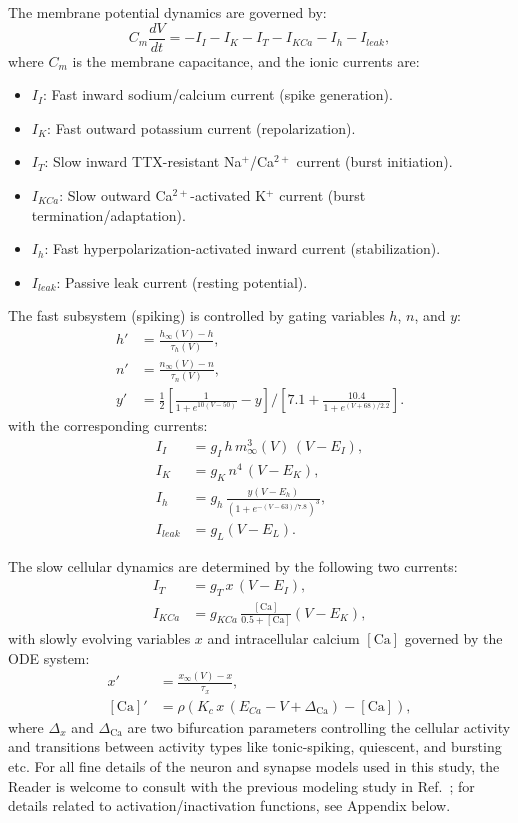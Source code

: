 \documentclass[nofootinbib,aip,amsmath,amssymb,reprint,twocolumn,10pt]{revtex4-2}
\begin{document}
The membrane potential dynamics are governed by:
\begin{equation}
C_m \frac{dV}{dt} = -I_{I} - I_K - I_{T} - I_{KCa} - I_h - I_{leak},
\end{equation}
where $C_m$ is the membrane capacitance, and the ionic currents are:
\begin{itemize}
  \item $I_{I}$: Fast inward sodium/calcium current (spike generation).
  \item $I_K$: Fast outward potassium current (repolarization).
  \item $I_{T}$: Slow inward TTX-resistant Na$^+$/Ca$^{2+}$ current (burst initiation).
  \item $I_{KCa}$: Slow outward Ca$^{2+}$-activated K$^+$ current (burst termination/adaptation).
  \item $I_h$: Fast hyperpolarization-activated inward current (stabilization).
  \item $I_{leak}$: Passive leak current (resting potential).
\end{itemize}

The fast subsystem (spiking) is controlled by gating variables $h$, $n$, and $y$:
\begin{align}
h' &= \frac{h_\infty(V) - h}{\tau_h(V)}, \\
n' &= \frac{n_\infty(V) - n}{\tau_n(V)}, \\
y' &= \frac{1}{2} \left[ \frac{1}{1 + e^{10(V-50)}} - y \right] / \left[ 7.1 + \frac{10.4}{1 + e^{(V+68)/2.2}} \right].
\end{align}
with the corresponding currents:
\begin{align}
I_{I} &= g_{I}\, h\, m_\infty^3(V)\, (V-E_{I}), \\
I_K &= g_K\, n^4\, (V-E_K), \\
I_h &= g_h\, \frac{y (V-E_h)}{(1 + e^{-(V-63)/7.8})^3}, \\
I_{leak} &= g_L (V-E_L).
\end{align}

The slow cellular dynamics are determined by the following two currents:
\begin{align}
I_{T} &= g_{T}\, x\, (V-E_{I}), \\
I_{KCa} &= g_{KCa}\, \frac{[\mathrm{Ca}]}{0.5 + [\mathrm{Ca}]} (V-E_K),
\end{align}
with slowly evolving variables $x$ and intracellular calcium $[\mathrm{Ca}]$ governed by the ODE system:
\begin{align}
x' &= \frac{x_\infty(V) - x}{\tau_x}, \\
[\mathrm{Ca}]' &= \rho \left( K_c\, x\, (E_{Ca} - V + \Delta_{\mathrm{Ca}}) - [\mathrm{Ca}] \right),
\end{align}
where $\Delta_x$ and $\Delta_{\mathrm{Ca}}$ are two bifurcation parameters controlling the cellular activity and transitions between activity types like tonic-spiking, quiescent, and bursting etc. 
For all fine details of the neuron and synapse models used in this study, the Reader is welcome to consult with the previous modeling study in Ref.~\cite{scully2024pairing}; for details related to activation/inactivation functions, see Appendix below.
\end{document}
